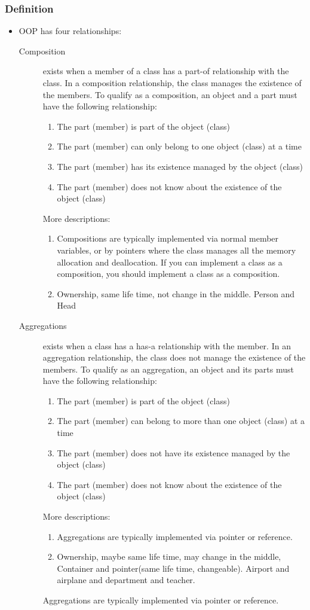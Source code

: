 \documentclass[a4paper,11pt,twoside]{book}
\begin{document}
\subsubsection{Definition}
\begin{itemize}
	\item OOP has four relationships:
	\begin{description}
		\item[Composition ] exists when a member of a class has a part-of relationship with the class. In a composition relationship, the class manages the existence of the members. To qualify as a composition, an object and a part must have the following relationship:
		\begin{enumerate}
			\item The part (member) is part of the object (class)
			\item The part (member) can only belong to one object (class) at a time
			\item The part (member) has its existence managed by the object (class)
			\item The part (member) does not know about the existence of the object (class)
		\end{enumerate}
	More descriptions: 
	\begin{enumerate}
		\item Compositions are typically implemented via normal member variables, or by pointers where the class manages all the memory allocation and deallocation. If you can implement a class as a composition, you should implement a class as a composition.
		\item  Ownership, same life time,  not change in the middle. Person and Head
	\end{enumerate}
	
	
	\item[Aggregations  ] exists when a class has a has-a relationship with the member. In an aggregation relationship, the class does not manage the existence of the members. To qualify as an aggregation, an object and its parts must have the following relationship:
	
	\begin{enumerate}
		\item The part (member) is part of the object (class)
		\item The part (member) can belong to more than one object (class) at a time
		\item The part (member) does not have its existence managed by the object (class)
		\item The part (member) does not know about the existence of the object (class)
	\end{enumerate}
	More descriptions: 
	\begin{enumerate}
		\item Aggregations are typically implemented via pointer or reference.
		\item Ownership, maybe same life time, may change in the middle,  Container and pointer(same life time, changeable). Airport and airplane and department and teacher.
	\end{enumerate}
	Aggregations are typically implemented via pointer or reference.
	

\end{description}
\end{itemize}
\end{document}
